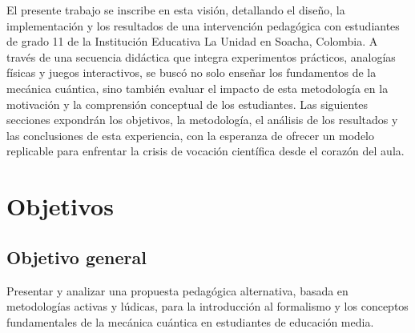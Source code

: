 \documentclass[10pt,a4paper]{article}
\begin{document}
\vspace{1em}
El presente trabajo se inscribe en esta visión, detallando el diseño, la implementación y los resultados de una intervención pedagógica con estudiantes de grado 11 de la Institución Educativa La Unidad en Soacha, Colombia. A través de una secuencia didáctica que integra experimentos prácticos, analogías físicas y juegos interactivos, se buscó no solo enseñar los fundamentos de la mecánica cuántica, sino también evaluar el impacto de esta metodología en la motivación y la comprensión conceptual de los estudiantes. Las siguientes secciones expondrán los objetivos, la metodología, el análisis de los resultados y las conclusiones de esta experiencia, con la esperanza de ofrecer un modelo replicable para enfrentar la crisis de vocación científica desde el corazón del aula.


\section{Objetivos}

\subsection{Objetivo general}

Presentar y analizar una propuesta pedagógica alternativa, basada en metodologías activas y lúdicas, para la introducción al formalismo y los conceptos fundamentales de la mecánica cuántica en estudiantes de educación media.
\end{document}
